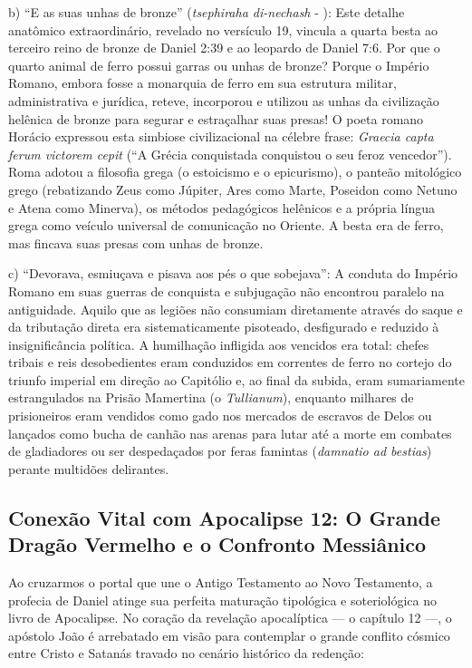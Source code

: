 b) ``E as suas unhas de bronze'' (\textit{tsephiraha di-nechash} - ): Este detalhe anatômico extraordinário, revelado no versículo 19, vincula a quarta besta ao terceiro reino de bronze de Daniel 2:39 e ao leopardo de Daniel 7:6. Por que o quarto animal de ferro possui garras ou unhas de bronze? Porque o Império Romano, embora fosse a monarquia de ferro em sua estrutura militar, administrativa e jurídica, reteve, incorporou e utilizou as unhas da civilização helênica de bronze para segurar e estraçalhar suas presas! O poeta romano Horácio expressou esta simbiose civilizacional na célebre frase: \textit{Graecia capta ferum victorem cepit} (``A Grécia conquistada conquistou o seu feroz vencedor''). Roma adotou a filosofia grega (o estoicismo e o epicurismo), o panteão mitológico grego (rebatizando Zeus como Júpiter, Ares como Marte, Poseidon como Netuno e Atena como Minerva), os métodos pedagógicos helênicos e a própria língua grega como veículo universal de comunicação no Oriente. A besta era de ferro, mas fincava suas presas com unhas de bronze.

c) ``Devorava, esmiuçava e pisava aos pés o que sobejava'': A conduta do Império Romano em suas guerras de conquista e subjugação não encontrou paralelo na antiguidade. Aquilo que as legiões não consumiam diretamente através do saque e da tributação direta era sistematicamente pisoteado, desfigurado e reduzido à insignificância política. A humilhação infligida aos vencidos era total: chefes tribais e reis desobedientes eram conduzidos em correntes de ferro no cortejo do triunfo imperial em direção ao Capitólio e, ao final da subida, eram sumariamente estrangulados na Prisão Mamertina (o \textit{Tullianum}), enquanto milhares de prisioneiros eram vendidos como gado nos mercados de escravos de Delos ou lançados como bucha de canhão nas arenas para lutar até a morte em combates de gladiadores ou ser despedaçados por feras famintas (\textit{damnatio ad bestias}) perante multidões delirantes.


\subsection{Conexão Vital com Apocalipse 12: O Grande Dragão Vermelho e o Confronto Messiânico}


Ao cruzarmos o portal que une o Antigo Testamento ao Novo Testamento, a profecia de Daniel atinge sua perfeita maturação tipológica e soteriológica no livro de Apocalipse. No coração da revelação apocalíptica — o capítulo 12 —, o apóstolo João é arrebatado em visão para contemplar o grande conflito cósmico entre Cristo e Satanás travado no cenário histórico da redenção:

